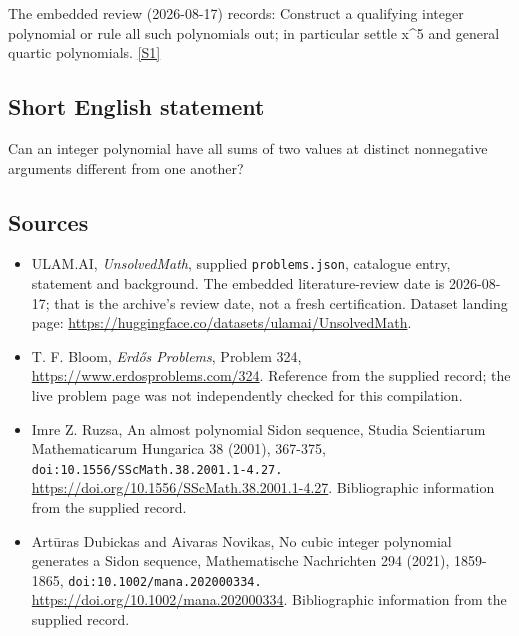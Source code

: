 \documentclass[11pt,a4paper]{article}
\newcommand{\sref}[2]{\hyperlink{source:#1:#2}{[S#2]}}
\begin{document}
The embedded review (2026-08-17) records: Construct a qualifying integer polynomial or rule all such polynomials out; in particular settle x\textasciicircum{}5 and general quartic polynomials. \sref{statement}{1}

\subsection{Short English statement}

Can an integer polynomial have all sums of two values at distinct nonnegative arguments different from one another?

\subsection{Sources}

{\small

\begin{itemize}

\item[\hypertarget{source:statement:1}{S1}] ULAM.AI, \emph{UnsolvedMath}, supplied \texttt{problems.json}, catalogue entry, statement and background. The embedded literature-review date is 2026-08-17; that is the archive’s review date, not a fresh certification. Dataset landing page: \url{https://huggingface.co/datasets/ulamai/UnsolvedMath}.

\item[\hypertarget{source:statement:2}{S2}] T. F. Bloom, \emph{Erdős Problems}, Problem 324, \url{https://www.erdosproblems.com/324}. Reference from the supplied record; the live problem page was not independently checked for this compilation.

\item[\hypertarget{source:statement:3}{S3}] Imre Z. Ruzsa, An almost polynomial Sidon sequence, Studia Scientiarum Mathematicarum Hungarica 38 (2001), 367-375, \nolinkurl{doi:10.1556/SScMath.38.2001.1-4.27.} \url{https://doi.org/10.1556/SScMath.38.2001.1-4.27}. Bibliographic information from the supplied record.

\item[\hypertarget{source:statement:4}{S4}] Artūras Dubickas and Aivaras Novikas, No cubic integer polynomial generates a Sidon sequence, Mathematische Nachrichten 294 (2021), 1859-1865, \nolinkurl{doi:10.1002/mana.202000334.} \url{https://doi.org/10.1002/mana.202000334}. Bibliographic information from the supplied record.

\end{itemize}

}

\label{end:statement}
\end{document}
